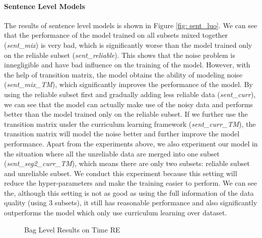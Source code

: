 \paragraph{Sentence Level Models}
The results of sentence level models is shown in Figure \ref{fig: sent_luo}. We can see that the performance of the model trained on all subsets mixed together (\emph{sent\_mix}) is very bad, which is significantly worse than the model trained only on the reliable subset (\emph{sent\_reliable}). This shows that the noise problem is innegligible and have bad influence on the training of the model. However, with the help of transition matrix, the model obtains the ability of modeling noise (\emph{sent\_mix\_TM}), which significantly improves the performance of the model. By using the reliable subset first and gradually adding less reliable data (\emph{sent\_curr}), we can see that the model can actually make use of the noisy data and performs better than the model trained only on the reliable subset. If we further use the transition matrix under the curriculum learning framework (\emph{sent\_curr\_TM}), the transition matrix will model the noise better and further improve the model performance. Apart from the experiments above, we also experiment our model in the situation where all the unreliable data are merged into one subset (\emph{sent\_seg2\_curr\_TM}), which means there are only two subsets: reliable subset and unreliable subset. We conduct this experiment because this setting will reduce the hyper-parameters and make the training easier to perform. We can see the, although this setting is not as good as using the full information of the data quality (using 3 subsets), it still has reasonable performance and also significantly outperforms the model which only use curriculum learning over dataset.


\begin{figure}[htbp]
\centering
{}
\caption{Bag Level Results on Time RE}
\label{fig: results_on_luo}
\end{figure}

